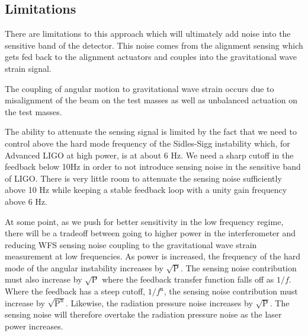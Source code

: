 \subsection{Limitations}


%
There are limitations to this approach which will ultimately add
noise into the sensitive band of the detector.
This noise comes from the alignment sensing which gets fed back to the
alignment actuators and couples into the gravitational wave strain signal.

The coupling of angular motion to gravitational wave strain occurs due to
misalignment of the beam on the test masses as well as unbalanced actuation
on the test masses.


The ability to attenuate the sensing signal is limited by the fact that
we need to control above the hard mode frequency of the Sidles-Sigg instability
\cite{2006PhLA..354..167S}
which,
for Advanced LIGO at high power, is at about 6 Hz.
We need a sharp cutoff in the feedback below 10Hz in order to not introduce
sensing noise in the sensitive band of LIGO.
There is very little room to attenuate the sensing noise sufficiently above 10
Hz while keeping a stable feedback loop with a unity gain frequency above 6 Hz.


At some point, as we push for better sensitivity in the low frequency regime,
there will be a tradeoff between going to higher power in the
interferometer and reducing WFS sensing noise coupling to the gravitational
wave strain measurement at low frequencies.
As power is increased, the frequency of the hard mode of the angular
instability increases by $\sqrt{\mathrm{P}}$.
The sensing noise contribution must also increase by $\sqrt{\mathrm{P}}$
where the feedback transfer function falls off as $1/f$.
Where the feedback has a steep cutoff, $1/f^\mathrm{n}$, the sensing noise
contribution must increase by $\sqrt{\mathrm{P^n}}$.
Likewise, the radiation pressure noise increases by $\sqrt{\mathrm{P}}$.
The sensing noise will therefore overtake the radiation pressure noise as the
laser power increases.


